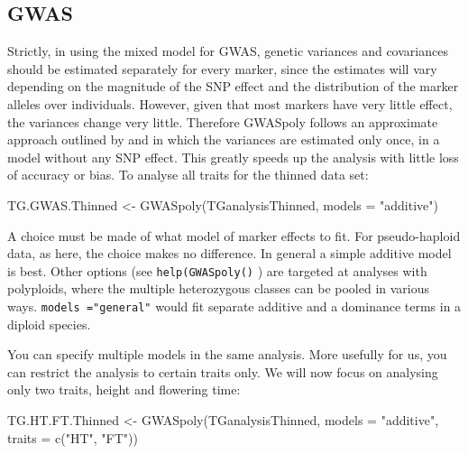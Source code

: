 \documentclass[
]{book}
\newenvironment{Shaded}{\begin{snugshade}}{\end{snugshade}}
\newcommand{\AttributeTok}[1]{\textcolor[rgb]{0.77,0.63,0.00}{#1}}
\newcommand{\FunctionTok}[1]{\textcolor[rgb]{0.00,0.00,0.00}{#1}}
\newcommand{\NormalTok}[1]{#1}
\newcommand{\OtherTok}[1]{\textcolor[rgb]{0.56,0.35,0.01}{#1}}
\newcommand{\StringTok}[1]{\textcolor[rgb]{0.31,0.60,0.02}{#1}}
\begin{document}
\hypertarget{gwas}{%
\subsection{GWAS}\label{gwas}}

Strictly, in using the mixed model for GWAS, genetic variances and covariances should be estimated separately for every marker, since the estimates will vary depending on the magnitude of the SNP effect and the distribution of the marker alleles over individuals. However, given that most markers have very little effect, the variances change very little.
Therefore GWASpoly follows an approximate approach outlined by \citet{kang_variance_2010} and \citet{zhang_mixed_2010} in which the variances are estimated only once, in a model without any SNP effect. This greatly speeds up the analysis with little loss of accuracy or bias. To analyse all traits for the thinned data set:

\begin{Shaded}
\begin{Highlighting}[]
\NormalTok{TG.GWAS.Thinned }\OtherTok{\textless{}{-}} \FunctionTok{GWASpoly}\NormalTok{(TGanalysisThinned, }\AttributeTok{models =} \StringTok{"additive"}\NormalTok{)}
\end{Highlighting}
\end{Shaded}

A choice must be made of what model of marker effects to fit. For pseudo-haploid data, as here, the choice makes no difference. In general a simple additive model is best. Other options (see \texttt{help(GWASpoly()} ) are targeted at analyses with polyploids, where the multiple heterozygous classes can be pooled in various ways. \texttt{models\ ="general"} would fit separate additive and a dominance terms in a diploid species.

You can specify multiple models in the same analysis. More usefully for us, you can restrict the analysis to certain traits only. We will now focus on analysing only two traits, height and flowering time:

\begin{Shaded}
\begin{Highlighting}[]
\NormalTok{TG.HT.FT.Thinned }\OtherTok{\textless{}{-}} \FunctionTok{GWASpoly}\NormalTok{(TGanalysisThinned, }\AttributeTok{models =} \StringTok{"additive"}\NormalTok{, }
    \AttributeTok{traits =} \FunctionTok{c}\NormalTok{(}\StringTok{"HT"}\NormalTok{, }\StringTok{"FT"}\NormalTok{))}
\end{Highlighting}
\end{Shaded}
\end{document}
